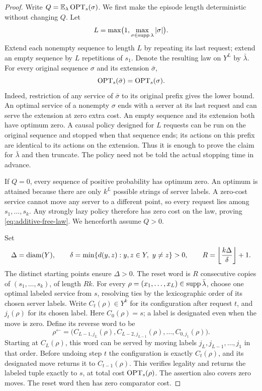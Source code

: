 \begin{proof}
Write $Q=\mathbb E_{\lambda}\operatorname{OPT}_s(\sigma)$.  We first make the episode length
deterministic without changing $Q$.  Let
\[
 L=\max\bigl(1,\max_{\sigma\in\operatorname{supp}\lambda}|\sigma|\bigr).
\]
Extend each nonempty sequence to length $L$ by repeating its last
request; extend an empty sequence by $L$ repetitions of $s_1$.
Denote the resulting law on $Y^L$ by $\bar\lambda$.  For every original
sequence $\sigma$ and its extension $\bar\sigma$,
\begin{equation}
 \operatorname{OPT}_s(\bar\sigma)=\operatorname{OPT}_s(\sigma).
 \label{eq:padding-optimum}
\end{equation}
Indeed, restriction of any service of $\bar\sigma$ to its original
prefix gives the lower bound.  An optimal service of a nonempty
$\sigma$ ends with a server at its last request and can serve the
extension at zero extra cost.  An empty sequence and its extension both
have optimum zero.  A causal policy designed for $L$ requests can be
run on the original sequence and stopped when that sequence ends; its
actions on this prefix are identical to its actions on the extension.
Thus it is enough to prove the claim for $\bar\lambda$ and then
truncate.  The policy need not be told the actual stopping time in
advance.

If $Q=0$, every sequence of positive probability has optimum zero.
An optimum is attained because there are only $k^L$ possible strings of
server labels.  A zero-cost service cannot move any server to a
different point, so every request lies among $s_1,\ldots,s_k$.
Any strongly lazy policy therefore has zero cost on the law, proving
\eqref{eq:additive-free-law}.  We henceforth assume $Q>0$.

Set
\[
 \Delta=\operatorname{diam}(Y),\qquad
 \delta=\min\{d(y,z):y,z\in Y,\ y\ne z\}>0,
 \qquad R=\left\lfloor\frac{k\Delta}{\delta}\right\rfloor+1.
\]
The distinct starting points ensure $\Delta>0$.  The reset word is
$R$ consecutive copies of $(s_1,\ldots,s_k)$, of length $Rk$.
For every $\rho=(x_1,\ldots,x_L)\in\operatorname{supp}\bar\lambda$, choose one
optimal labeled service from $s$, resolving ties by the lexicographic
order of its chosen server labels.  Write $C_t(\rho)\in Y^k$ for its
configuration after request $t$, and $j_t(\rho)$ for its chosen label.
Here $C_0(\rho)=s$; a label is designated even when the move is zero.
Define its reverse word to be
\begin{equation}
 \rho^{\leftarrow}
  =\bigl(C_{L-1,j_L}(\rho),C_{L-2,j_{L-1}}(\rho),
              \ldots,C_{0,j_1}(\rho)\bigr).
 \label{eq:reverse-word}
\end{equation}
Starting at $C_L(\rho)$, this word can be served by moving labels
$j_L,j_{L-1},\ldots,j_1$ in that order.  Before undoing step $t$ the
configuration is exactly $C_t(\rho)$, and its designated move returns
it to $C_{t-1}(\rho)$.  This verifies legality and returns the labeled
tuple exactly to $s$, at total cost $\operatorname{OPT}_s(\rho)$.  The assertion also
covers zero moves.  The reset word then has zero comparator cost.


\end{proof}
